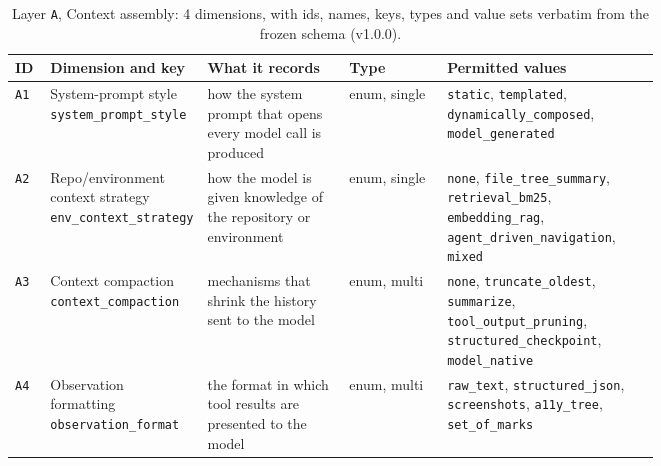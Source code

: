 \begin{table}[htbp]
\caption{Layer \texttt{A}, Context assembly: 4 dimensions, with ids, names, keys, types and value
sets verbatim from the frozen schema (v1.0.0).}
\label{tab:coding-A}
\footnotesize
\begin{tabular}{@{}l p{0.20\linewidth} p{0.22\linewidth} l p{0.33\linewidth}@{}}
\toprule
ID & Dimension and key & What it records & Type & Permitted values \tabularnewline
\midrule
\texttt{A1} & \raggedright System-prompt style \newline \texttt{system\_prompt\_style} & \raggedright how the system prompt that opens every model call is produced & enum, single & \raggedright \texttt{static}, \texttt{templated}, \texttt{dynamically\_composed}, \texttt{model\_generated} \tabularnewline
\texttt{A2} & \raggedright Repo/environment context strategy \newline \texttt{env\_context\_strategy} & \raggedright how the model is given knowledge of the repository or environment & enum, single & \raggedright \texttt{none}, \texttt{file\_tree\_summary}, \texttt{retrieval\_bm25}, \texttt{embedding\_rag}, \texttt{agent\_driven\_navigation}, \texttt{mixed} \tabularnewline
\texttt{A3} & \raggedright Context compaction \newline \texttt{context\_compaction} & \raggedright mechanisms that shrink the history sent to the model & enum, multi & \raggedright \texttt{none}, \texttt{truncate\_oldest}, \texttt{summarize}, \texttt{tool\_output\_pruning}, \texttt{structured\_checkpoint}, \texttt{model\_native} \tabularnewline
\texttt{A4} & \raggedright Observation formatting \newline \texttt{observation\_format} & \raggedright the format in which tool results are presented to the model & enum, multi & \raggedright \texttt{raw\_text}, \texttt{structured\_json}, \texttt{screenshots}, \texttt{a11y\_tree}, \texttt{set\_of\_marks} \tabularnewline
\bottomrule
\end{tabular}
\end{table}

